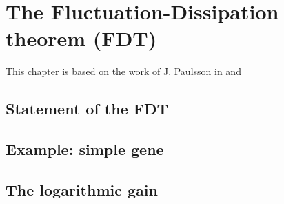 \chapter{The Fluctuation-Dissipation theorem (FDT)}

This chapter is based on the work of J. Paulsson in \cite{paulsson04} and \cite{paulsson05}


\section{Statement of the FDT}

\section{Example: simple gene}

\section{The logarithmic gain}
\label{sec:log_gain}
